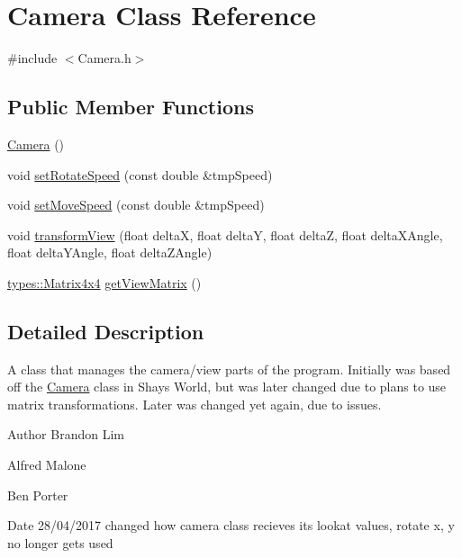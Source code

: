 \hypertarget{class_camera}{}\section{Camera Class Reference}
\label{class_camera}


{\ttfamily \#include $<$Camera.\+h$>$}

\subsection*{Public Member Functions}
\begin{DoxyCompactItemize}
\item 
\hyperlink{class_camera_a01f94c3543f56ede7af49dc778f19331}{Camera} ()
\item 
void \hyperlink{class_camera_a32fb83395d75711d7b50ce022439c929}{set\+Rotate\+Speed} (const double \&tmp\+Speed)
\item 
void \hyperlink{class_camera_a419891b41cdf19be447cc8bc5f9b385a}{set\+Move\+Speed} (const double \&tmp\+Speed)
\item 
void \hyperlink{class_camera_a07a02bc4c1c98952f55320133f3021f9}{transform\+View} (float delta\+X, float delta\+Y, float delta\+Z, float delta\+X\+Angle, float delta\+Y\+Angle, float delta\+Z\+Angle)
\item 
\hyperlink{structtypes_1_1_matrix4x4}{types\+::\+Matrix4x4} \hyperlink{class_camera_a1a50c82cd914b5a216039742338dc9d6}{get\+View\+Matrix} ()
\end{DoxyCompactItemize}


\subsection{Detailed Description}
A class that manages the camera/view parts of the program. Initially was based off the \hyperlink{class_camera}{Camera} class in Shay\textquotesingle{}s World, but was later changed due to plans to use matrix transformations. Later was changed yet again, due to issues. \begin{DoxyAuthor}{Author}
Brandon Lim 

Alfred Malone 

Ben Porter 
\end{DoxyAuthor}
\begin{DoxyDate}{Date}
28/04/2017 changed how camera class recieves it\textquotesingle{}s lookat values, rotate x, y no longer gets used 


\end{DoxyDate}


